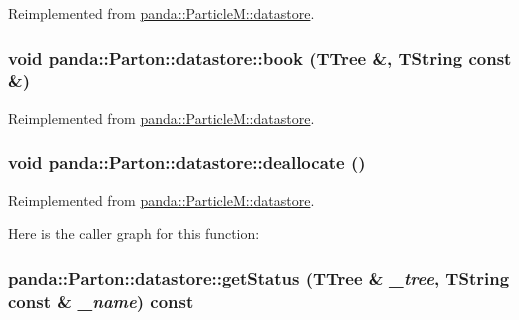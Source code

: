 Reimplemented from \hyperlink{structpanda_1_1ParticleM_1_1datastore_aafc17a88cf8425ff45a00b5fd2eb5751}{panda::ParticleM::datastore}.\hypertarget{structpanda_1_1Parton_1_1datastore_ae8dc1e83cadb773ac9c7a3f14dea85b3}{
\subsubsection[{book}]{\setlength{\rightskip}{0pt plus 5cm}void panda::Parton::datastore::book (TTree \&, \/  TString const \&)}}
\label{structpanda_1_1Parton_1_1datastore_ae8dc1e83cadb773ac9c7a3f14dea85b3}


Reimplemented from \hyperlink{structpanda_1_1ParticleM_1_1datastore_ae2eb76ca042d8b3e899c027ee07b5860}{panda::ParticleM::datastore}.\hypertarget{structpanda_1_1Parton_1_1datastore_a37d5d064962d581ebccadf6a683b9dc6}{
\subsubsection[{deallocate}]{\setlength{\rightskip}{0pt plus 5cm}void panda::Parton::datastore::deallocate ()}}
\label{structpanda_1_1Parton_1_1datastore_a37d5d064962d581ebccadf6a683b9dc6}


Reimplemented from \hyperlink{structpanda_1_1ParticleM_1_1datastore_a85c4ce11f1d7c6944a525ad2488880aa}{panda::ParticleM::datastore}.

Here is the caller graph for this function:\hypertarget{structpanda_1_1Parton_1_1datastore_af82916b07ec783b268c2491cd5b374be}{
\subsubsection[{getStatus}]{ panda::Parton::datastore::getStatus (TTree \& {\em \_\-tree}, \/  TString const \& {\em \_\-name}) const}}
\label{structpanda_1_1Parton_1_1datastore_af82916b07ec783b268c2491cd5b374be}


